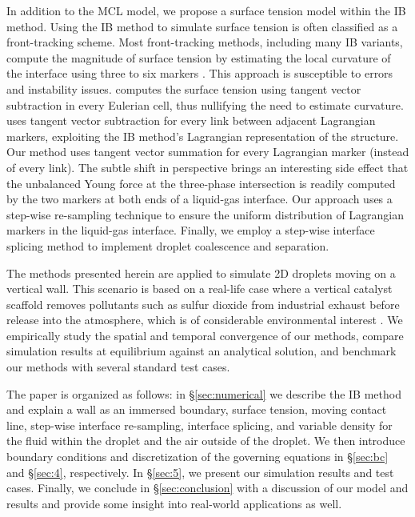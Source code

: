 \documentclass{jfm}
\begin{document}
In addition to the MCL model, we propose a surface tension model within the IB method. Using the IB method to simulate surface tension is often classified as a front-tracking scheme. Most front-tracking methods, including many IB variants, compute the magnitude of surface tension by estimating the local curvature of the interface using three to six markers \citep{surface_tension_IB_estimates_curvature, multi_phase_2018}. This approach is susceptible to errors and instability issues. \cite{surface_tension_still_tangent_applied_to_segment} computes the surface tension using tangent vector subtraction in every Eulerian cell, thus nullifying the need to estimate curvature. \cite{eulerian_tension_lagrangian_advection} uses tangent vector subtraction for every link between adjacent Lagrangian markers, exploiting the IB method's Lagrangian representation of the structure. Our method uses tangent vector summation for every Lagrangian marker (instead of every link). The subtle shift in perspective brings an interesting side effect that the unbalanced Young force at the three-phase intersection is readily computed by the two markers at both ends of a liquid-gas interface. Our approach uses a step-wise re-sampling technique to ensure the uniform distribution of Lagrangian markers in the liquid-gas interface. Finally, we employ a step-wise interface splicing method to implement droplet coalescence and separation. 

The methods presented herein are applied to simulate 2D droplets moving on a vertical wall. This scenario is based on a real-life case where a vertical catalyst scaffold removes pollutants such as sulfur dioxide from industrial exhaust before release into the atmosphere, which is of considerable environmental interest \citep{MPIreport2018}. We empirically study the spatial and temporal convergence of our methods, compare simulation results at equilibrium against an analytical solution, and benchmark our methods with several standard test cases.

{\color{blue}The paper is organized as follows: in \S\ref{sec:numerical} we describe the IB method and explain a wall as an immersed boundary, surface tension, moving contact line, step-wise interface re-sampling, interface splicing, and variable density for the fluid within the droplet and the air outside of the droplet. We then introduce boundary conditions and discretization of the governing equations in \S\ref{sec:bc} and \S\ref{sec:4}, respectively. In \S\ref{sec:5}, we present our simulation results and test cases. Finally, we conclude in \S\ref{sec:conclusion} with a discussion of our model and results and provide some insight into real-world applications as well.}
\end{document}
